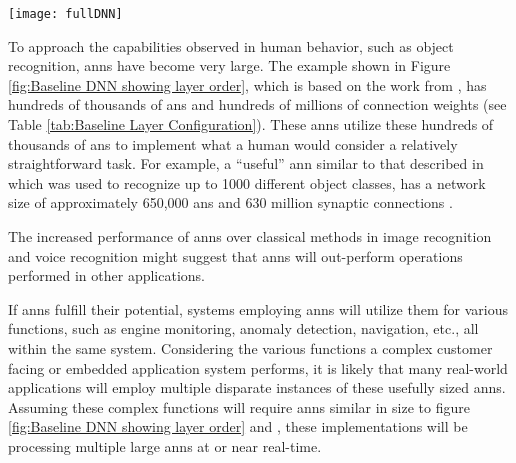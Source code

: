 \begin{sidewaysfigure}[h]
    \bigskip

      \begin{minipage}{1\textwidth}
        \centering
        \texttt{[image: fullDNN]}
        \captionsetup{justification=centering, skip=15pt}
        \label{fig:Baseline DNN showing layer order}
      \end{minipage}
  
\end{sidewaysfigure}



\iffalse
\begin{sidewaysfigure}[h]
\centering
\texttt{[image: fullDNN]}
\captionsetup{justification=centering, skip=15pt}
\caption{DNN showing layer order \cite{krizhevsky2012imagenet}}
\label{fig:DNN showing layer order}
\end{sidewaysfigure}
\fi

To approach the capabilities observed in human behavior, such as object recognition, \ac{ann}s have become very large. 
The example shown in Figure \ref{fig:Baseline DNN showing layer order}, which is based on the work from \cite{krizhevsky2012imagenet}, has hundreds of thousands of \acp{an} and hundreds of millions of connection weights (see Table \ref{tab:Baseline Layer Configuration}).
These \acp{ann} utilize these hundreds of thousands of \acp{an} to implement what a human would consider a relatively straightforward task.
For example, a ``useful'' \ac{ann} similar to that described in \cite{krizhevsky2012imagenet} which was used to recognize up to 1000 different object classes, has a network size of approximately 650,000 \acp{an} and 630 million synaptic connections \cite{krizhevsky2012imagenetPreso}. 

The increased performance of \ac{ann}s over classical methods in image recognition and voice recognition might suggest that \ac{ann}s will out-perform operations performed in other applications.
\iffalse There is reason to believe that \acp{ann} will replace various functions in existing systems. \fi

If \acp{ann} fulfill their potential, systems employing \ac{ann}s will utilize them for various functions, such as engine monitoring, anomaly detection, navigation, etc., all within the same system.
Considering the various functions a complex customer facing or embedded application system performs, it is likely that many real-world applications will employ multiple disparate instances of these usefully sized \acp{ann}.
Assuming these complex functions will require \ac{ann}s similar in size to figure \ref{fig:Baseline DNN showing layer order} and \cite{krizhevsky2012imagenet}, these implementations will be processing multiple large \ac{ann}s at or near real-time.

